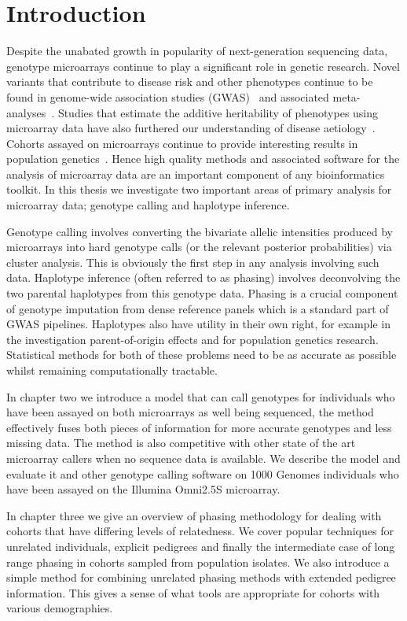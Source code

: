 \chapter{Introduction}
Despite the unabated growth in popularity of next-generation sequencing data, genotype microarrays continue to play a significant role in genetic research. Novel variants that contribute to disease risk and other phenotypes continue to be found in genome-wide association studies (GWAS)~\citep{ripke2013genome} and associated meta-analyses~\citep{evangelou2013meta}.  Studies that estimate the additive heritability of phenotypes using microarray data have also furthered our understanding of disease aetiology~\citep{lee2011,lee2012estimating}. Cohorts assayed on microarrays continue to provide interesting results in population genetics~\citep{ralph2012geography,lawson2012inference}.  Hence high quality methods and associated software for the analysis of microarray data are an important component of any bioinformatics toolkit. In this thesis we investigate two important areas of primary analysis for microarray data; genotype calling and haplotype inference. 

Genotype calling  involves converting the bivariate allelic intensities produced by microarrays into hard genotype calls (or the relevant posterior probabilities)  via cluster analysis.  This is obviously the first step in any analysis involving such data.  Haplotype inference (often referred to as phasing) involves deconvolving the two parental haplotypes from this genotype data. Phasing is a crucial component of genotype imputation from dense reference panels which is a standard part of GWAS pipelines. Haplotypes also have utility in their own right, for example in the investigation parent-of-origin effects and for population genetics research.  Statistical methods for both of these problems need to be as accurate as possible whilst remaining computationally tractable.

In chapter two we introduce a model  that can call genotypes for individuals who have been assayed on both microarrays as well being sequenced, the method effectively fuses both pieces of information for more accurate genotypes and less missing data.  The method is also competitive with other state of the art microarray callers when no sequence data is available.  We describe the model and evaluate it and other genotype calling software on 1000 Genomes individuals who have been assayed on the Illumina Omni2.5S microarray.

In chapter three we give an overview of phasing methodology for dealing with cohorts that have differing levels of relatedness. We cover popular techniques for unrelated individuals,  explicit pedigrees and finally the intermediate case of long range phasing in cohorts sampled from population isolates.  We also introduce a simple method for combining unrelated phasing methods with extended pedigree information. This gives a sense of what tools are appropriate for cohorts with various demographies.

